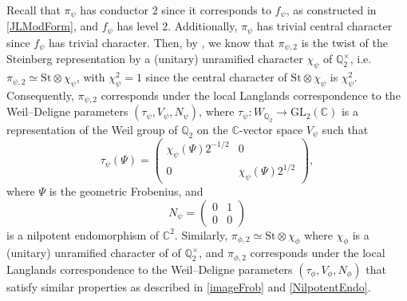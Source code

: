 \documentclass[11pt]{amsart}
\theoremstyle{definition}
\begin{document}
Recall that $\pi_{\psi}$ has conductor $2$ since it corresponds to $f_{\psi}$, as constructed in \eqref{JLModForm}, and $f_{\psi}$ has level $2$. Additionally, $\pi_{\psi}$ has trivial central character since $f_{\psi}$ has trivial character. Then, by \cite[Prop.~2.8]{LocalComponents}, we know that $\pi_{\psi,2}$ is the twist of the Steinberg representation by a (unitary) unramified character $\chi_{\psi}$ of $\mathbb{Q}_{2}^{\times}$, i.e.~$\pi_{\psi,2} \simeq \mathrm{St}\otimes \chi_{\psi}$, with $\chi_{\psi}^{2} = 1$ since the central character of $\mathrm{St}\otimes \chi_{\psi}$ is $\chi_{\psi}^2$. Consequently, $\pi_{\psi,2}$ corresponds under the local Langlands correspondence to the Weil--Deligne parameters $(\tau_{\psi}, V_{\psi}, N_{\psi})$, where $\tau_{\psi}:W_{\mathbb{Q}_2} \rightarrow \mathrm{GL}_2(\mathbb{C})$ is a representation of the Weil group of $\mathbb{Q}_2$ on the $\mathbb{C}$-vector space $V_{\psi}$ such that 
\begin{equation}
    \tau_{\psi}(\Psi) = \begin{pmatrix}
        \chi_{\psi}(\Psi)2^{-1/2} & 0 \\ 0 & \chi_{\psi}(\Psi) 2^{1/2}
    \end{pmatrix}, \label{imageFrob}
\end{equation}
where $\Psi$ is the geometric Frobenius, and 
\begin{equation}
    N_{\psi} = \begin{pmatrix}
        0 & 1 \\ 0 & 0
    \end{pmatrix} \label{NilpotentEndo}
\end{equation}
is a nilpotent endomorphism of $\mathbb{C}^2$. Similarly, $\pi_{\phi,2} \simeq \mathrm{St}\otimes \chi_{\phi}$ where $\chi_{\phi}$ is a (unitary) unramified character of of $\mathbb{Q}_{2}^{\times}$, and $\pi_{\phi,2}$ corresponds under the local Langlands correspondence to the Weil--Deligne parameters $(\tau_{\phi}, V_{\phi}, N_{\phi})$ that satisfy similar properties as described in \eqref{imageFrob} and \eqref{NilpotentEndo}.
\end{document}
